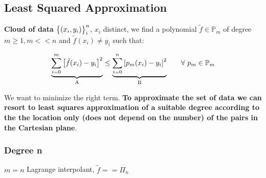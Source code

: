 \subsection{Least Squared Approximation}
    \textbf{Cloud of data} $\Brackets{(x_i,y_i)}^n_{i}$, $x_i$ distinct, we find a polynomial $\tilde{f}\in\mathbb{P}_m$ of degree $m\geq 1,m<<n$ and $\tilde{f}(x_i)\neq y_i$ such that:
    \begin{LARGE}
        $$
        \underlabel{
            \sum_{i=0}^m\left[\tilde{f}(x_i)-y_i\right]^2
        }{A}
        \leq
        \underlabel{
            \sum_{i=0}^n\left[p_m(x_i)-y_i\right]^2
        }{B}
        \qquad\forall\,\,p_m\in\mathbb{P}_m
        $$
    \end{LARGE}
    We want to minimize the right term. \textbf{To approximate the set of data we can resort to least squares approximation of a suitable degree according to the the location only (does not depend on the number) of the pairs in the Cartesian plane}.
    \subsubsection{Degree n}
    $m=n$ Lagrange interpolant, $\tilde{f}==\Pi_n$

